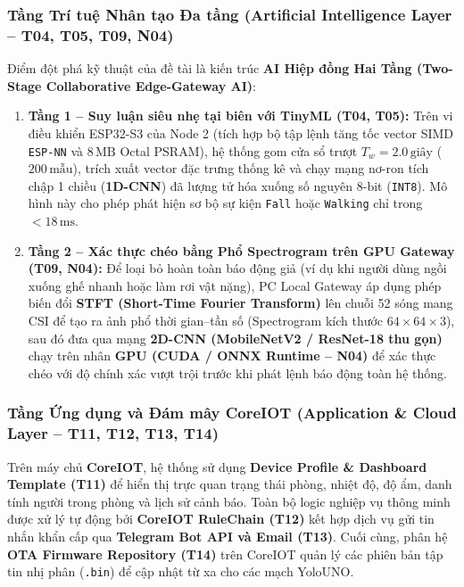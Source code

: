 \documentclass{hcmut-report}
\begin{document}
\subsubsection[Tầng Trí tuệ Nhân tạo Đa tầng (T04, T05, T09, N04)]{Tầng Trí tuệ Nhân tạo Đa tầng (Artificial Intelligence Layer -- T04, T05, T09, N04)}
Điểm đột phá kỹ thuật của đề tài là kiến trúc \textbf{AI Hiệp đồng Hai Tầng (Two-Stage Collaborative Edge-Gateway AI)}:
\begin{enumerate}
  \item \textbf{Tầng 1 -- Suy luận siêu nhẹ tại biên với TinyML (\textbf{T04, T05}):} Trên vi điều khiển ESP32-S3 của Node 2 (tích hợp bộ tập lệnh tăng tốc vector SIMD \texttt{ESP-NN} và $8\,\text{MB}$ Octal PSRAM), hệ thống gom cửa sổ trượt $T_w = 2.0\,\text{giây}$ ($200\,\text{mẫu}$), trích xuất vector đặc trưng thống kê và chạy mạng nơ-ron tích chập 1 chiều (\textbf{1D-CNN}) đã lượng tử hóa xuống số nguyên 8-bit (\texttt{INT8}). Mô hình này cho phép phát hiện sơ bộ sự kiện \texttt{Fall} hoặc \texttt{Walking} chỉ trong $<18\,\text{ms}$.
  \item \textbf{Tầng 2 -- Xác thực chéo bằng Phổ Spectrogram trên GPU Gateway (\textbf{T09, N04}):} Để loại bỏ hoàn toàn báo động giả (ví dụ khi người dùng ngồi xuống ghế nhanh hoặc làm rơi vật nặng), PC Local Gateway áp dụng phép biến đổi \textbf{STFT (Short-Time Fourier Transform)} lên chuỗi 52 sóng mang CSI để tạo ra ảnh phổ thời gian--tần số (Spectrogram kích thước $64 \times 64 \times 3$), sau đó đưa qua mạng \textbf{2D-CNN (MobileNetV2 / ResNet-18 thu gọn)} chạy trên nhân \textbf{GPU (CUDA / ONNX Runtime -- N04)} để xác thực chéo với độ chính xác vượt trội trước khi phát lệnh báo động toàn hệ thống.
\end{enumerate}

\subsubsection[Tầng Ứng dụng và Đám mây CoreIOT (T11--T14)]{Tầng Ứng dụng và Đám mây CoreIOT (Application \& Cloud Layer -- T11, T12, T13, T14)}
Trên máy chủ \textbf{CoreIOT}, hệ thống sử dụng \textbf{Device Profile \& Dashboard Template (\textbf{T11})} để hiển thị trực quan trạng thái phòng, nhiệt độ, độ ẩm, danh tính người trong phòng và lịch sử cảnh báo. Toàn bộ logic nghiệp vụ thông minh được xử lý tự động bởi \textbf{CoreIOT RuleChain (\textbf{T12})} kết hợp dịch vụ gửi tin nhắn khẩn cấp qua \textbf{Telegram Bot API và Email (\textbf{T13})}. Cuối cùng, phân hệ \textbf{OTA Firmware Repository (\textbf{T14})} trên CoreIOT quản lý các phiên bản tập tin nhị phân (\texttt{.bin}) để cập nhật từ xa cho các mạch YoloUNO.
\end{document}
